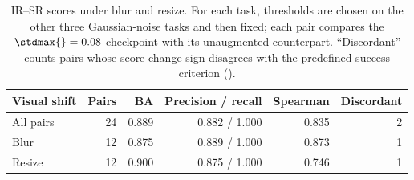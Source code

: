 \begin{table}[t]
\centering
\caption{IR--SR scores under blur and resize. For each task, thresholds are chosen on the other three Gaussian-noise tasks and then fixed; each pair compares the $\stdmax{}=0.08$ checkpoint with its unaugmented counterpart. ``Discordant'' counts pairs whose score-change sign disagrees with the predefined success criterion ().}
\label{tab:cross-stressor-ir-sr-summary}
\small
\setlength{\tabcolsep}{4pt}
\begin{tabular}{lrrrrr}
\toprule
Visual shift & Pairs & BA & Precision / recall & Spearman & Discordant \\
\midrule
All pairs & 24 & 0.889 & 0.882 / 1.000 & 0.835 & 2 \\
Blur & 12 & 0.875 & 0.889 / 1.000 & 0.873 & 1 \\
Resize & 12 & 0.900 & 0.875 / 1.000 & 0.746 & 1 \\
\bottomrule
\end{tabular}
\end{table}
